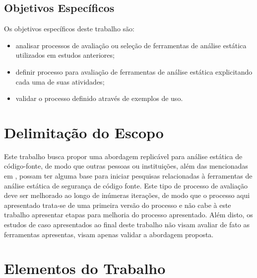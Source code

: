 \subsection*{Objetivos Específicos}

Os objetivos específicos deste trabalho são:
\begin{itemize}
    \item analisar processos de avaliação ou seleção de ferramentas de análise estática utilizados em estudos anteriores;
    \item definir processo para avaliação de ferramentas de análise estática explicitando cada uma de suas atividades;
    \item validar o processo definido através de exemplos de uso.
\end{itemize}
\section*{Delimitação do Escopo}

Este trabalho busca propor uma abordagem replicável para análise estática de código-fonte, de modo que outras pessoas ou instituições, além das mencionadas em , possam ter alguma base para iniciar pesquisas relacionadas à ferramentas de análise estática de segurança de código fonte. Este tipo de processo de avaliação deve ser melhorado ao longo de inúmeras iterações, de modo que o processo aqui apresentado trata-se de uma primeira versão do processo e não cabe à este trabalho apresentar etapas para melhoria do processo apresentado. Além disto, os estudos de caso apresentados ao final deste trabalho não visam avaliar de fato as ferramentas apresentas, visam apenas validar a abordagem proposta.


\section*{Elementos do Trabalho}

